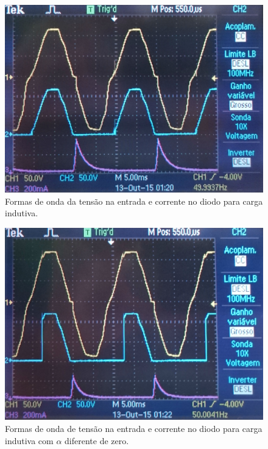 \documentclass[a4paper,11pt]{article}
\numberwithin{equation}{section}
\begin{document}
\begin{figure}[H]
	\centering
	\includegraphics[keepaspectratio=true, scale=0.12]{img/figs/diodo_alfa_zero}
	\caption{Formas de onda da tensão na entrada e corrente no diodo para carga indutiva.}
	\label{fig:diodo_alfa_zero}
	\vspace{-0.8em}
\end{figure}

\begin{figure}[H]
	\centering
	\includegraphics[keepaspectratio=true, scale=0.12]{img/figs/diodo_alfa_dif_zero}
	\caption{Formas de onda de tensão na entrada e corrente no diodo para carga indutiva com $\alpha$ diferente de zero.}
	\label{fig:diodo_alfa_dif_zero}
	\vspace{-0.8em}
\end{figure}
\end{document}
